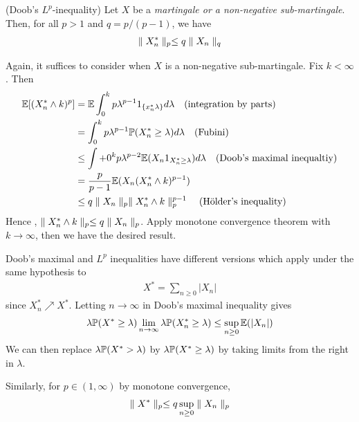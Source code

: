 \documentclass[10pt,a4paper]{report}
\newenvironment{proof}
{\begin{changemargin}{1cm}{0.5cm} 
	}%
	{\end{changemargin}
}
\begin{document}
 (Doob's $L^p$-inequality) Let $X$ be a \emph{martingale or a non-negative sub-martingale}. Then, for all $p>1$ and $q = p/(p-1)$, we have
\begin{align*}
\parallel X^*_n \parallel_{p} \leq q \parallel X_n \parallel_{q} 
\end{align*}
\begin{proof}
\pf Again, it suffices to consider when $X$ is a non-negative sub-martingale. Fix $k < \infty$. Then
\begin{align*}
\mathbb{E} [ (X^*_n \wedge k)^p  ] &= \mathbb{E} \int_0^k p \lambda^{p-1} 1_{\{x^*_n \lambda \}} d\lambda \quad \text{(integration by parts)}\\
& = \int_0^k p \lambda^{p-1} \mathbb{P}(X^*_n \geq \lambda) d\lambda \quad \text{(Fubini)} \\
& \leq \int+0^k p\lambda^{p-2} \mathbb{E} (X_n 1_{X^*_n \geq \lambda}) d\lambda \quad \text{(Doob's maximal inequaltiy)} \\
& =\frac{p}{p-1} \mathbb{E}(X_n (X^*_n \wedge k)^{p-1} ) \\
& \leq q \parallel X_n \parallel_{p} \parallel X^*_n \wedge k \parallel_{p}^{p-1} \quad \text{(H\"{o}lder's inequality)}
\end{align*}
Hence , $\parallel X^*_n \wedge k \parallel_{p} \leq q\parallel X_n \parallel_{p}$. Apply monotone convergence theorem with $k\rightarrow \infty$, then we have the desired result.

\eop
\end{proof}
\s

Doob's maximal and $L^p$ inequalities have different versions which apply under the same hypothesis to
\begin{align*}
X^* = \sum_{n\geq 0} |X_n|
\end{align*}
since $X^*_n \nearrow X^*$. Letting $n\rightarrow \infty$ in Doob's maximal inequality gives
\begin{align*}
\lambda \mathbb{P}(X^* \geq \lambda) \lim_{n\rightarrow \infty} \lambda \mathbb{P}(X^*_n \geq \lambda) \leq \sup_{n\geq 0} \mathbb{E}(|X_n|)
\end{align*}
We can then replace $\lambda \mathbb{P}(X^* >\lambda)$ by $\lambda \mathbb{P} (X^* \geq \lambda)$ by taking limits from the right in $\lambda$.

\quad Similarly, for $p\in (1,\infty)$ by monotone convergence,
\begin{align*}
\parallel X^* \parallel_{p} \leq q \sup_{n\geq 0} \parallel X_n \parallel_{p}
\end{align*}
\end{document}
